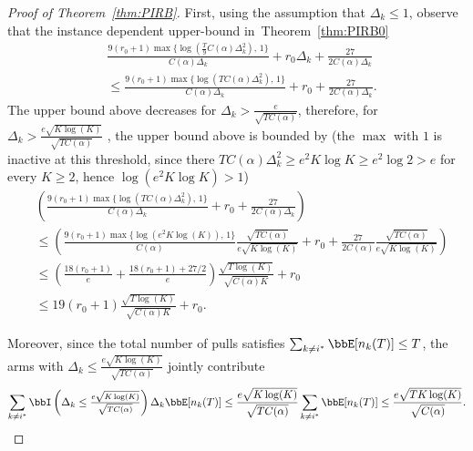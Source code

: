 \documentclass[11pt]{article}
\begin{document}
\begin{proof}[Proof of Theorem~\ref{thm:PIRB}]
First, using the assumption that $\Delta_k\leq 1$, observe that the instance dependent upper-bound in~Theorem~\ref{thm:PIRB0}
\begin{align} 
\nonumber
&\frac{9(r_0+1)\max\{\log(\frac{T}{9} C(\alpha)\Delta_k^2),\,1\}}{C(\alpha)\Delta_k} + r_0 \Delta_k + \frac{27}{2 C(\alpha) \Delta_k}
\\
    &\leq  \frac{9(r_0+1) \max\{\log(T C(\alpha)\Delta_k^2),\,1\}}{C(\alpha)\Delta_k} + r_0 + \frac{27}{2 C(\alpha) \Delta_k}.
    \end{align}
The upper bound above decreases for  $\Delta_k > \frac{e}{\sqrt{TC(\alpha)}}$, therefore, for $\Delta_k > \frac{e\sqrt{K\log(K)}}{\sqrt{TC(\alpha)}}$
, the upper bound above is bounded by (the $\max$ with $1$ is inactive at this threshold, since there $T C(\alpha)\Delta_k^2 \geq e^2 K\log K \geq e^2 \log 2 > e$ for every $K \geq 2$, hence $\log(e^2K\log K) > 1$) 
\begin{align}
    \nonumber
   & \left(\frac{9(r_0+1) \max\{\log(T C(\alpha)\Delta_k^2),\,1\}}{C(\alpha)\Delta_k} + r_0 + \frac{27}{2 C(\alpha) \Delta_k}  \right)
    \\
    \nonumber
    &\leq  \left(\frac{9(r_0+1) \max\{\log(e^2 K \log(K)),\,1\}}{C(\alpha)} \frac{\sqrt{TC(\alpha)}} {e\sqrt{K\log(K)}} + r_0 + \frac{27}{2 C(\alpha) } \frac{\sqrt{TC(\alpha)}} {e\sqrt{K\log(K)}} \right)
    \\
    \nonumber
    &\leq \left(\frac{18(r_0+1)}{e}+\frac{18(r_0+1)+27/2}{ e}   \right) \frac{\sqrt{T\log(K)}}{\sqrt{C(\alpha)K}} + r_0 
    \\
    & \leq 19(r_0+1) \frac{\sqrt{T\log(K)}}{\sqrt{C(\alpha)K}} + r_0.
    \label{eq:MA11}
\end{align}

Moreover, since the total number of pulls satisfies $\sum_{k \neq i^*} \bbE[n_k(T)] \leq T$, the arms with $\Delta_k \leq  \frac{e\sqrt{K\log(K)}}{\sqrt{TC(\alpha)}}$ jointly contribute
\begin{align}
  \sum_{k \neq i^*} \bbI\left(\Delta_k \leq \tfrac{e\sqrt{K\log(K)}}{\sqrt{TC(\alpha)}}\right) \Delta_k  \bbE[n_k(T)] \leq \frac{e\sqrt{K\log(K)}}{\sqrt{TC(\alpha)}} \sum_{k \neq i^*} \bbE[n_k(T)] \leq \frac{e\sqrt{T K\log(K)}}{\sqrt{C(\alpha)}}.
  \label{eq:MA12}
\end{align}


\end{proof}
\end{document}
